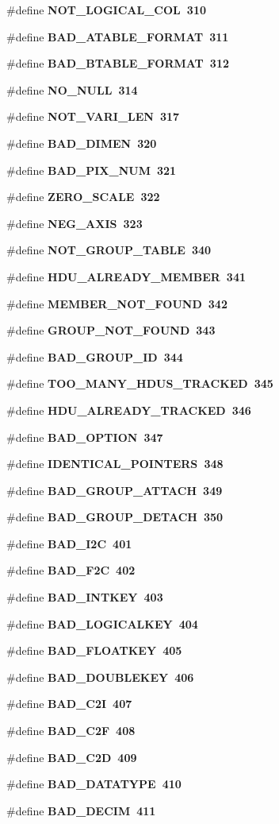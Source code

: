\begin{CompactItemize}
\item 
\#define \bf{NOT\_\-LOGICAL\_\-COL}~310
\item 
\#define \bf{BAD\_\-ATABLE\_\-FORMAT}~311
\item 
\#define \bf{BAD\_\-BTABLE\_\-FORMAT}~312
\item 
\#define \bf{NO\_\-NULL}~314
\item 
\#define \bf{NOT\_\-VARI\_\-LEN}~317
\item 
\#define \bf{BAD\_\-DIMEN}~320
\item 
\#define \bf{BAD\_\-PIX\_\-NUM}~321
\item 
\#define \bf{ZERO\_\-SCALE}~322
\item 
\#define \bf{NEG\_\-AXIS}~323
\item 
\#define \bf{NOT\_\-GROUP\_\-TABLE}~340
\item 
\#define \bf{HDU\_\-ALREADY\_\-MEMBER}~341
\item 
\#define \bf{MEMBER\_\-NOT\_\-FOUND}~342
\item 
\#define \bf{GROUP\_\-NOT\_\-FOUND}~343
\item 
\#define \bf{BAD\_\-GROUP\_\-ID}~344
\item 
\#define \bf{TOO\_\-MANY\_\-HDUS\_\-TRACKED}~345
\item 
\#define \bf{HDU\_\-ALREADY\_\-TRACKED}~346
\item 
\#define \bf{BAD\_\-OPTION}~347
\item 
\#define \bf{IDENTICAL\_\-POINTERS}~348
\item 
\#define \bf{BAD\_\-GROUP\_\-ATTACH}~349
\item 
\#define \bf{BAD\_\-GROUP\_\-DETACH}~350
\item 
\#define \bf{BAD\_\-I2C}~401
\item 
\#define \bf{BAD\_\-F2C}~402
\item 
\#define \bf{BAD\_\-INTKEY}~403
\item 
\#define \bf{BAD\_\-LOGICALKEY}~404
\item 
\#define \bf{BAD\_\-FLOATKEY}~405
\item 
\#define \bf{BAD\_\-DOUBLEKEY}~406
\item 
\#define \bf{BAD\_\-C2I}~407
\item 
\#define \bf{BAD\_\-C2F}~408
\item 
\#define \bf{BAD\_\-C2D}~409
\item 
\#define \bf{BAD\_\-DATATYPE}~410
\item 
\#define \bf{BAD\_\-DECIM}~411
\item 

\end{CompactItemize}
